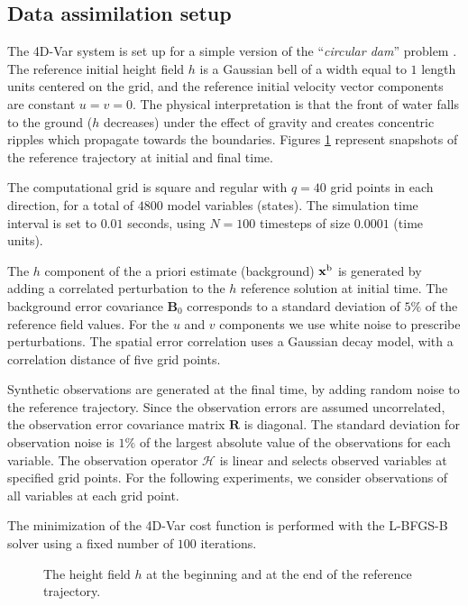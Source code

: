 \documentclass[final,sort&compress]{elsarticle}
\newcommand{\Hobs}{\mathcal{H}}
\newcommand{\B}{\mathbf{B}}
\newcommand{\R}{\mathbf{R}}
\newcommand{\xb}{ \mathbf{x}^{\rm b} }
\begin{document}
\subsection{Data assimilation setup}\label{sec:dasetup}

The 4D-Var system is set up for a simple version of the ``\textit{circular dam}'' problem \cite{anastasiou1997solution}.
The reference initial height field $h$ is a Gaussian bell of a width equal to $1$ length units centered on the grid, and 
the reference initial velocity vector components are constant $u=v=0$. 
The physical interpretation is that the front of water falls to the ground ($h$ decreases) under the effect of gravity
and creates concentric ripples which propagate towards the boundaries. 
Figures \ref{fig:swetraj} represent snapshots of the reference trajectory at initial and final time. 

The computational grid is square and regular with $q=40$ grid points in each direction, for a total of $4800$ model variables (states).
The simulation time interval is set to $0.01$ seconds, using $N=100$ timesteps of size $0.0001$ (time units).

The $h$ component of the a priori estimate (background) $\xb$ is generated by adding a correlated perturbation to the $h$ reference solution at initial time.
The background error covariance $\B_0$ corresponds to a standard deviation of $5\%$ of the reference field values.
For the $u$ and $v$ components we use white noise to prescribe perturbations.
The spatial error correlation uses a Gaussian decay model, with a correlation distance of five grid points. 

Synthetic observations are generated at the final time, by adding random noise to the reference trajectory.
Since the observation errors are assumed uncorrelated, the observation error covariance matrix $\R$ is diagonal. 
The standard deviation for observation noise is $1\%$ of the largest absolute value of the observations for each variable.
The observation operator $\Hobs$ is linear and selects observed variables at specified grid points. 
For the following experiments, we consider observations of all variables at each grid point. 

The minimization of the 4D-Var cost function is performed with the L-BFGS-B solver \cite{zhu1997algorithm} using a fixed number of $100$ iterations.

\begin{figure}
\centering
{}
\caption{The height field $h$ at the beginning and at the end of the reference trajectory.}
\label{fig:swetraj}
\end{figure}
\end{document}
